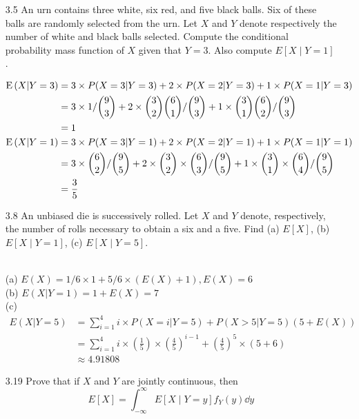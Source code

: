 \documentclass[en,hazy,blue,12pt,device = normal]{elegantnote}
\begin{document}
\begin{enumerate}
    \item[3.5] An urn contains three white, six red, and five black balls. Six of these balls are randomly selected from the urn. Let $X$ and $Y$ denote respectively the number of white and black balls selected. Compute the conditional probability mass function of $X$ given that $Y=3$. Also compute $E[X \mid Y=1]$.
    \begin{tcolorbox}
        \sol
        \begin{align*}
            \operatorname E\left(X|Y=3\right) &= 3\times P(X=3|Y=3) + 2\times P(X = 2|Y=3) + 1\times P(X= 1|Y=3) \\
            &= 3\times 1/\binom{9}{3} + 2\times \binom{3}{2}\binom{6}{1}/\binom{9}{3} +1\times \binom{3}{1}\binom{6}{2} /\binom{9}{3}\\
            &= 1\\
            \operatorname E\left(X|Y=1\right) &= 3\times P(X=3|Y=1) + 2\times P(X = 2|Y=1) + 1\times P(X= 1|Y=1)\\
            &=3\times \binom{6}{2}/\binom{9}{5} + 2\times \binom{3}{2}\times\binom{6}{3}/\binom{9}{5} +1\times \binom{3}{1}\times\binom{6}{4} /\binom{9}{5}\\
            &= \frac{3}{5}
        \end{align*}
    \end{tcolorbox}
    \item[3.8]An unbiased die is successively rolled. Let $X$ and $Y$ denote, respectively, the number of rolls necessary to obtain a six and a five. Find (a) $E[X]$, (b) $E[X \mid Y=1]$, (c) $E[X \mid Y=5]$.
    \begin{tcolorbox}
        \sol\\
        (a) \(E(X) = 1/6\times 1 + 5/6\times (E(X)+1), E(X) = 6\)\\
        (b) \(E(X|Y = 1) = 1 + E(X) = 7\)\\
        (c) \begin{align*}
            E(X|Y=5) &= \sum_{i=1}^4 i\times P(X=i|Y=5)+ P(X > 5|Y=5)(5+E(X))\\
            &= \sum_{i=1}^4 i\times\left(\frac 1 5\right)\times\left(\frac 4 5\right)^{i-1} + \left(\frac 4 5\right)^{5}\times(5+6)\\
            &\approx 4.91808
        \end{align*}
    \end{tcolorbox}

    \item[3.19] Prove that if $X$ and $Y$ are jointly continuous, then
    $$
    E[X]=\int_{-\infty}^{\infty} E[X \mid Y=y] f_Y(y) \dd y
    $$


\end{enumerate}
\end{document}

